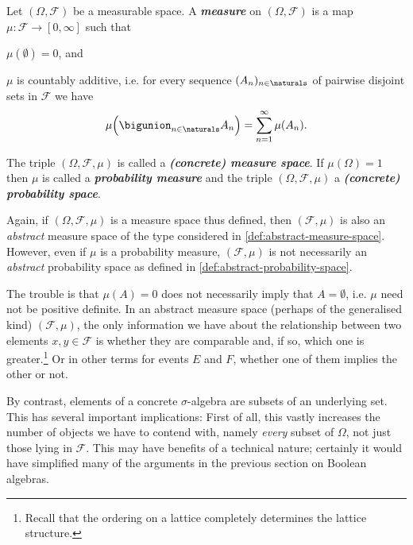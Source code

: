 \documentclass[article, a4paper, 11pt, oneside]{memoir}
\numberwithin{equation}{chapter}
\newcommand{\calF}{\mathcal{F}}
\newcommand{\keyword}[1]{{\itshape\bfseries #1}}
\begin{document}
\begin{definition}
    Let $(\Omega, \calF)$ be a measurable space. A \keyword{measure} on $(\Omega, \calF)$ is a map $\mu \colon \calF \to [0,\infty]$ such that
    \begin{enumdef}
        \item $\mu(\emptyset) = 0$, and
        \item $\mu$ is countably additive, i.e. for every sequence $(A_n)_{n\in\naturals}$ of pairwise disjoint sets in $\calF$ we have
        \begin{equation*}
            \mu \Bigl( \bigunion_{n\in\naturals} A_n \Bigr)
                = \sum_{n=1}^\infty \mu(A_n).
        \end{equation*}
    \end{enumdef}
    The triple $(\Omega, \calF, \mu)$ is called a \keyword{(concrete) measure space}. If $\mu(\Omega) = 1$ then $\mu$ is called a \keyword{probability measure} and the triple $(\Omega, \calF, \mu)$ a \keyword{(concrete) probability space}.
\end{definition}
%
Again, if $(\Omega, \calF, \mu)$ is a measure space thus defined, then $(\calF, \mu)$ is also an \emph{abstract} measure space of the type considered in \cref{def:abstract-measure-space}. However, even if $\mu$ is a probability measure, $(\calF, \mu)$ is not necessarily an \emph{abstract} probability space as defined in \cref{def:abstract-probability-space}.

The trouble is that $\mu(A) = 0$ does not necessarily imply that $A = \emptyset$, i.e. $\mu$ need not be positive definite. In an abstract measure space (perhaps of the generalised kind) $(\calF,\mu)$, the only information we have about the relationship between two elements $x,y \in \calF$ is whether they are comparable and, if so, which one is greater.\footnote{Recall that the ordering on a lattice completely determines the lattice structure.} Or in other terms for events $E$ and $F$, whether one of them implies the other or not.

By contrast, elements of a concrete $\sigma$-algebra are subsets of an underlying set. This has several important implications: First of all, this vastly increases the number of objects we have to contend with, namely \emph{every} subset of $\Omega$, not just those lying in $\calF$. This may have benefits of a technical nature; certainly it would have simplified many of the arguments in the previous section on Boolean algebras.
\end{document}

